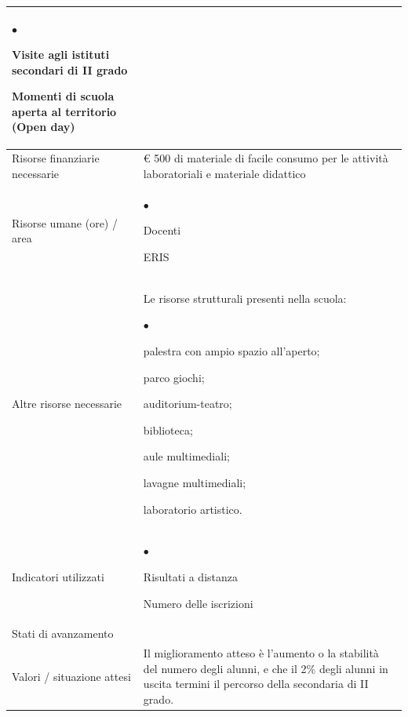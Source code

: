 \documentclass[12pt,a4paper,oneside]{memoir}
\newenvironment{elenco}{\begin{list}{$\bullet$}{%
              \setlength{\leftmargin}{4mm}%
              \setlength{\rightmargin}{1mm}%
               \setlength{\itemindent}{0mm}%
               \setlength{\labelwidth}{2mm}%
               \setlength{\labelsep}{2mm}%
              \setlength{\itemsep}{-\parsep}%
              \setlength{\partopsep}{0pt}%
              \setlength{\topsep}{0pt}%
             \setlength{\parskip}{0pt}%
              }}{\end{list}}
\begin{document}
\begin{footnotesize}
\begin{longtable}{|>{\raggedright}p{2.5cm}|>{\raggedright\arraybackslash}P{10cm}|}
\begin{elenco}
\item Visite agli istituti secondari di II grado
\item Momenti di scuola aperta al  territorio (Open day)
\end{elenco}\\[-4mm] \hline
Risorse finanziarie necessarie&€ 500 di materiale di facile consumo per le attività laboratoriali e materiale didattico\\ \hline
Risorse umane (ore) / area&
\begin{elenco}
\item Docenti 
\item ERIS
\end{elenco}\\[-4mm] \hline
Altre risorse necessarie&Le risorse strutturali presenti nella scuola:
\begin{elenco}
\item palestra con ampio spazio all'aperto;
\item parco giochi;
\item auditorium-teatro;
\item biblioteca;
\item aule multimediali;
\item lavagne multimediali;
\item laboratorio artistico.
\end{elenco}\\[-4mm] \hline
Indicatori utilizzati&
\begin{elenco}
\item Risultati a distanza 
\item Numero delle iscrizioni
\end{elenco}\\[-4mm] \hline
Stati di avanzamento&\\ \hline
Valori / situazione attesi&Il miglioramento atteso è l'aumento o la stabilità del numero degli alunni, e che il 2\% degli alunni in uscita termini il percorso della secondaria di II grado.\\ \hline
\end{longtable}
\end{footnotesize}

\vspace{24pt}
\end{document}
